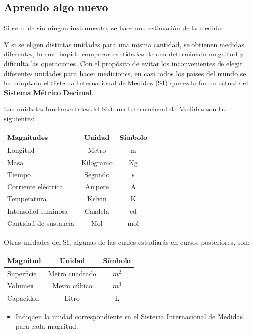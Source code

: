\documentclass[letterpaper,11pt,twoside]{article}
\begin{document}
\begin{multicols}{2}
\section*{Aprendo algo nuevo}
Si se mide sin ningún instrumento, se hace una estimación
de la medida.

Y si se eligen distintas unidades para una misma cantidad, se
obtienen medidas diferentes, lo cual impide comparar cantidades de una determinada magnitud y dificulta las operaciones.
Con el propósito de evitar los inconvenientes de elegir diferentes unidades para hacer mediciones, en casi todos los
países del mundo se ha adoptado el Sistema Internacional de Medidas (\textbf{SI}) que es la forma actual del \textbf{Sistema Métrico Decimal}.

Las unidades fundamentales del Sistema Internacional de Medidas son las siguientes:
\begin{center}
\begin{tabular}{|l|c|c|}
\hline 
\qquad \textbf{Magnitudes} & \textbf{Unidad} & \textbf{Símbolo} \\ 
\hline 
Longitud & Metro & m \\ 
\hline 
Masa & Kilogramo & Kg \\ 
\hline 
Tiempo & Segundo & s \\ 
\hline 
Corriente eléctrica & Ampere & A \\ 
\hline 
Temperatura & Kelvin & K \\ 
\hline 
Intensidad luminosa & Candela & cd \\ 
\hline 
Cantidad de sustancia & Mol & mol \\ 
\hline 
\end{tabular} 
\end{center}
Otras unidades del SI, algunas de las cuales estudiarás en
cursos posteriores, son:
\begin{center}
\begin{tabular}{|l|c|c|}
\hline 
\qquad \textbf{Magnitud} & \textbf{Unidad} & \textbf{Símbolo} \\ 
\hline 
Superficie & Metro cuadrado & $m^{2}$ \\ 
\hline 
Volumen & Metro cúbico & $m^{3}$ \\ 
\hline 
Capacidad & Litro & L \\ 
\hline 
\end{tabular} 
\end{center}
\begin{itemize}
\item Indiquen la unidad correspondiente en el Sistema Internacional de Medidas para cada magnitud.

\end{itemize}
\end{multicols}
\end{document}
